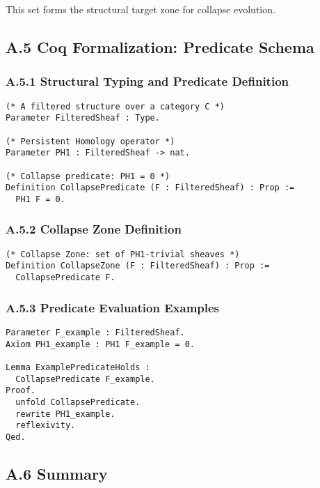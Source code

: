 \documentclass[11pt]{article}
\begin{document}
This set forms the structural target zone for collapse evolution.

\subsection*{A.5 Coq Formalization: Predicate Schema}

\subsubsection*{A.5.1 Structural Typing and Predicate Definition}

\begin{lstlisting}[language=Coq, caption=Collapse Predicate Definition, captionpos=b]
(* A filtered structure over a category C *)
Parameter FilteredSheaf : Type.

(* Persistent Homology operator *)
Parameter PH1 : FilteredSheaf -> nat.

(* Collapse predicate: PH1 = 0 *)
Definition CollapsePredicate (F : FilteredSheaf) : Prop :=
  PH1 F = 0.
\end{lstlisting}

\subsubsection*{A.5.2 Collapse Zone Definition}

\begin{lstlisting}[language=Coq, caption=Collapse Zone Structure, captionpos=b]
(* Collapse Zone: set of PH1-trivial sheaves *)
Definition CollapseZone (F : FilteredSheaf) : Prop :=
  CollapsePredicate F.
\end{lstlisting}

\subsubsection*{A.5.3 Predicate Evaluation Examples}

\begin{lstlisting}[language=Coq, caption=Example Predicate Usage, captionpos=b]
Parameter F_example : FilteredSheaf.
Axiom PH1_example : PH1 F_example = 0.

Lemma ExamplePredicateHolds :
  CollapsePredicate F_example.
Proof.
  unfold CollapsePredicate.
  rewrite PH1_example.
  reflexivity.
Qed.
\end{lstlisting}

\subsection*{A.6 Summary}
\end{document}

